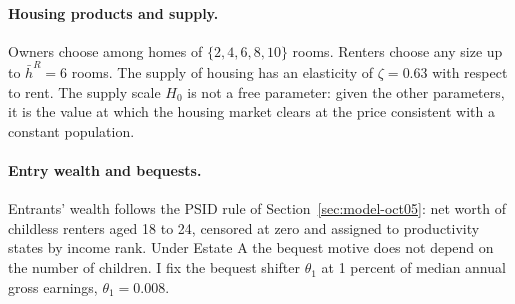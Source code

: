 \paragraph{Housing products and supply.}
Owners choose among homes of $\{2,4,6,8,10\}$ rooms. Renters choose any size
up to $\bar h^R=6$ rooms. The supply of housing has an elasticity of
$\zeta=0.63$ with respect to rent. The supply scale $H_0$ is not a free
parameter: given the other parameters, it is the value at which the housing
market clears at the price consistent with a constant population.

\paragraph{Entry wealth and bequests.}
Entrants' wealth follows the PSID rule of Section~\ref{sec:model-oct05}:
net worth of childless renters aged 18 to 24, censored at zero and assigned to
productivity states by income rank. Under Estate A the bequest motive does not
depend on the number of children. I fix the bequest shifter $\theta_1$ at 1
percent of median annual gross earnings, $\theta_1=0.008$.

